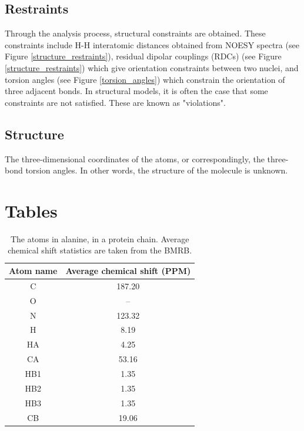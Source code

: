 \subsection*{Restraints}
Through the analysis process, structural constraints are obtained.  These 
constraints include H-H interatomic distances obtained from NOESY spectra
(see Figure \ref{structure_restraints}), residual dipolar couplings (RDCs) 
(see Figure \ref{structure_restraints}) which give orientation constraints
between two nuclei, and torsion angles 
(see Figure \ref{torsion_angles}) which constrain the orientation of three
adjacent bonds.
In structural models, it is often the case that some constraints are not 
satisfied.  These are known as "violations".

\subsection*{Structure} 
The three-dimensional coordinates of the atoms, or correspondingly, the
three-bond torsion angles.  In other words, the structure of the molecule
is unknown.



\clearpage
\section{Tables}

\begin{table}[h]
  \begin{tabular}{ | c | c | }
    \hline
    Atom name   &  Average chemical shift (PPM)  \\  \hline
    C           &  187.20     \\  \hline
    O           &  --         \\  \hline
    N           &  123.32     \\  \hline
    H           &  8.19       \\  \hline
    HA          &  4.25       \\  \hline
    CA          &  53.16      \\  \hline
    HB1         &  1.35       \\  \hline
    HB2         &  1.35       \\  \hline    
    HB3         &  1.35       \\  \hline
    CB          &  19.06      \\  \hline
  \end{tabular}
  \caption[The atoms in alanine, in a protein chain.]
          {The atoms in alanine, in a protein chain.
           Average chemical shift statistics are taken from the BMRB.}
  \label{alanine_atoms}
\end{table}

